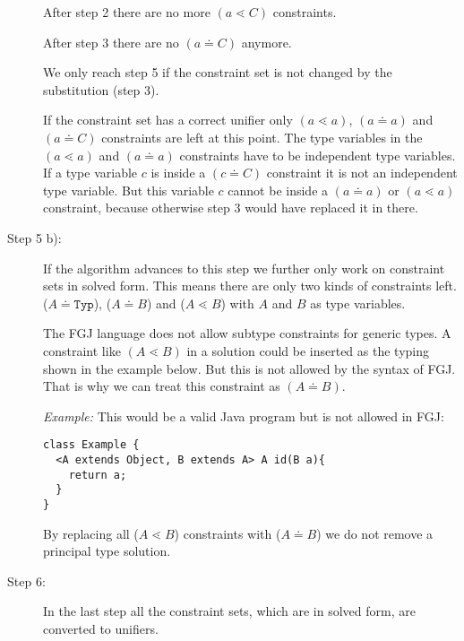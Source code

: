 \documentclass[runningheads]{llncs}
\begin{document}
\begin{description}
After step 2 there are no more $(a \lessdot C)$ constraints.

After step 3 there are no $(a \doteq C)$ anymore.

We only reach step 5 if the constraint set is not changed by the substitution (step 3).


If the constraint set has a correct unifier only $(a \lessdot a)$, $(a \doteq a)$ and $(a \doteq C)$ constraints are left at this point.
The type variables in the $(a \lessdot a)$ and $(a \doteq a)$ constraints have to be independent type variables.
If a type variable $c$ is inside a $(c \doteq C)$ constraint it is not an independent type variable.
But this variable $c$ cannot be inside a $(a \doteq a)$ or $(a \lessdot a)$ constraint, because otherwise step 3 would have replaced it in there.


\item[Step 5 b):]
If the algorithm advances to this step we further only work on constraint sets in solved form.
This means there are only two kinds of constraints left.
($A \doteq \texttt{Typ}$), ($A \doteq B$) and ($A \lessdot B$) with $A$ and $B$ as type variables.


The FGJ language does not allow subtype constraints for generic types.
A constraint like $(A \lessdot B)$ in a solution could be inserted as the typing shown in the example below.
But this is not allowed by the syntax of FGJ.
That is why we can treat this constraint as $(A \doteq B)$.


\textit{Example:}
This would be a valid Java program but is not allowed in FGJ:
\begin{lstlisting}
class Example {
  <A extends Object, B extends A> A id(B a){
    return a;
  }
}
\end{lstlisting}

By replacing all ($A \lessdot B$) constraints with ($A \doteq B$) we do not remove a principal type solution.

\item[Step 6:]
In the last step all the constraint sets, which are in solved form, are converted to unifiers.


\end{description}
\end{document}
